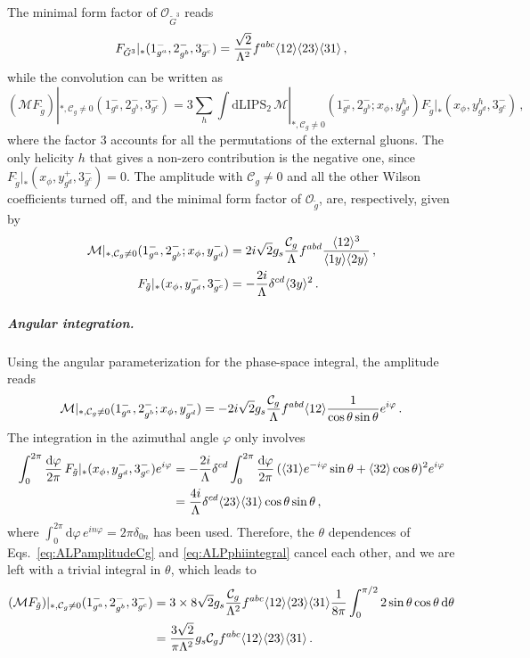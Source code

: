 The minimal form factor of $\mathcal O_{\tilde G^3}$ reads
\begin{equation}
    F_{\tilde G^3}|_*(1^-_{g^a},2^-_{g^b},3^-_{g^c})=\frac{\sqrt 2}{\Lambda^2}f^{abc}\langle 1 2 \rangle\langle 2 3 \rangle\langle 3 1 \rangle\,,
\end{equation}
while the convolution can be written as
\begin{equation}
    (\mathcal M F_{\tilde g})|_{*,\mathcal C_g \neq  0}(1^-_{g^a},2^-_{g^b},3^-_{g^c}) = 3 \sum_{h}\int \text{dLIPS}_2\, \mathcal{M}|_{*,\mathcal C_g \neq  0}(1^-_{g^a},2^-_{g^b};x_\phi,y^h_{g^d})
    F_{\tilde g}|_*(x_\phi,y^h_{g^d},3^-_{g^c})\,,
\end{equation}
where the factor $3$ accounts for all the permutations of the external gluons.
The only helicity $h$ that gives a non-zero contribution is the negative one, since
$F_{\tilde g}|_*(x_\phi,y^+_{g^d},3^-_{g^c}) = 0$.
The amplitude with $\mathcal C_g\neq 0$ and all the other Wilson coefficients turned off, and
the minimal form factor of $\mathcal O_{\tilde g}$, are, respectively, given by
\begin{align}
    \mathcal{M}|_{*,\mathcal C_g \neq  0}(1^-_{g^a},2^-_{g^b};x_\phi,y^-_{g^d}) &= 2i\sqrt{2}g_s \frac{\mathcal C_g}{\Lambda}f^{abd}\frac{ \langle 1 2 \rangle^3 }{ \langle 1 y \rangle \langle 2 y \rangle}\,,\\
    F_{\tilde g}|_*(x_\phi,y^-_{g^d},3^-_{g^c}) &= -\frac{2i}{\Lambda}\delta^{cd}\langle 3 y \rangle^2\,.
\end{align}

\subparagraph{Angular integration.}
Using the angular parameterization for the phase-space integral, the amplitude reads
\begin{equation}\label{eq:ALPamplitudeCg}
    \mathcal{M}|_{*,\mathcal C_g \neq  0}(1^-_{g^a},2^-_{g^b};x_\phi,y^-_{g^d}) = -2i\sqrt{2}g_s \frac{\mathcal C_g}{\Lambda}f^{abd}\langle 1 2 \rangle\frac{1}{ \cos\theta\sin\theta}e^{i\varphi}\,.
\end{equation}
The integration in the azimuthal angle $\varphi$ only involves
\begin{align}
    \int_0^{2\pi}\frac{\text{d}\varphi}{2\pi}\,F_{\tilde g}|_*(x_\phi,y^-_{g^d},3^-_{g^c}) e^{i\varphi} &=
    -\frac{2i}{\Lambda}\delta^{cd}\int_0^{2\pi}\frac{\text{d}\varphi}{2\pi}\, (\langle 3 1 \rangle e^{-i\varphi}\sin\theta + \langle 3 2 \rangle\cos\theta)^2e^{i\varphi}
    \nonumber \\&=\frac{4i}{\Lambda}\delta^{cd}\langle 2 3 \rangle\langle 3 1 \rangle\cos\theta\sin\theta\,,\label{eq:ALPphiintegral}
\end{align}
where $\int_0^{2\pi} \text{d}\varphi\,e^{in\varphi}=2\pi\delta_{0n}$ has been used.
Therefore, the $\theta$ dependences of Eqs.~\eqref{eq:ALPamplitudeCg} and
\eqref{eq:ALPphiintegral} cancel each other, and we are left with a trivial integral in
$\theta$, which leads to
\begin{align}
    (\mathcal M F_{\tilde g})|_{*,\mathcal C_g \neq  0}(1^-_{g^a},2^-_{g^b},3^-_{g^c}) &= 3\times 8\sqrt 2 g_s \frac{\mathcal C_g}{\Lambda^2}f^{abc}\langle 1 2 \rangle\langle 2 3 \rangle \langle 3 1 \rangle \frac{1}{8\pi}\int_0^{\pi/2}2\sin\theta\cos\theta\,\text{d}\theta \nonumber \\
    &= \frac{3\sqrt{2}}{\pi\Lambda^2} g_s\mathcal  C_gf^{abc} \langle 1 2 \rangle\langle 2 3 \rangle \langle 3 1 \rangle\,.
\end{align}

